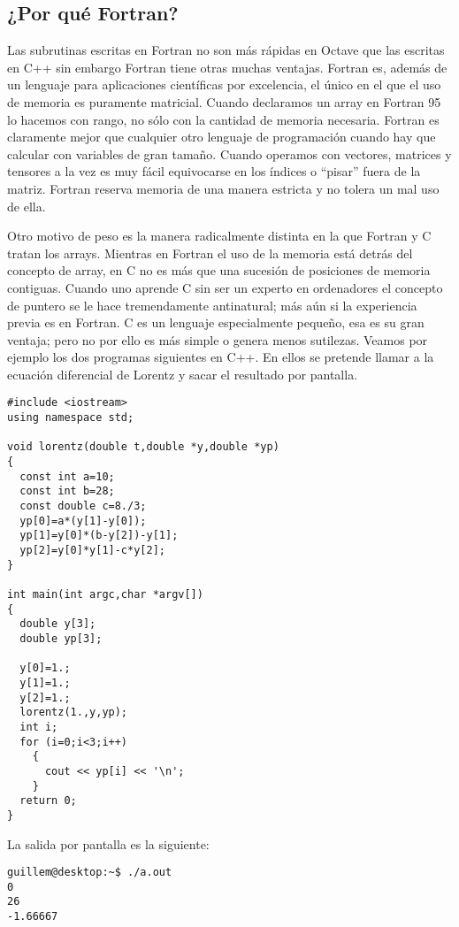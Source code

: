 \subsection{¿Por qué Fortran?}

Las subrutinas escritas en Fortran no son más rápidas en Octave que
las escritas en C++ sin embargo Fortran tiene otras muchas ventajas.
Fortran es, además de un lenguaje para aplicaciones científicas por
excelencia, el único en el que el uso de memoria es puramente
matricial.  Cuando declaramos un array en Fortran 95 lo hacemos con
rango, no sólo con la cantidad de memoria necesaria. Fortran es
claramente mejor que cualquier otro lenguaje de programación cuando
hay que calcular con variables de gran tamaño. Cuando operamos con
vectores, matrices y tensores a la vez es muy fácil equivocarse en los
índices o {}``pisar'' fuera de la matriz. Fortran reserva memoria de
una manera estricta y no tolera un mal uso de ella.

Otro motivo de peso es la manera radicalmente distinta en la que
Fortran y C tratan los arrays.  Mientras en Fortran el uso de la
memoria está detrás del concepto de array, en C no es más que una
sucesión de posiciones de memoria contiguas.  Cuando uno aprende C sin
ser un experto en ordenadores el concepto de puntero se le hace
tremendamente antinatural; más aún si la experiencia previa es en
Fortran. C es un lenguaje especialmente pequeño, esa es su gran
ventaja; pero no por ello es más simple o genera menos sutilezas.
Veamos por ejemplo los dos programas siguientes en C++.  En ellos se
pretende llamar a la ecuación diferencial de Lorentz y sacar el
resultado por pantalla.

\begin{verbatim}
#include <iostream>
using namespace std;

void lorentz(double t,double *y,double *yp)
{
  const int a=10;
  const int b=28;
  const double c=8./3;
  yp[0]=a*(y[1]-y[0]);
  yp[1]=y[0]*(b-y[2])-y[1];
  yp[2]=y[0]*y[1]-c*y[2];
}

int main(int argc,char *argv[])
{
  double y[3];
  double yp[3];

  y[0]=1.;
  y[1]=1.;
  y[2]=1.;
  lorentz(1.,y,yp);
  int i;
  for (i=0;i<3;i++)
    {
      cout << yp[i] << '\n';
    }
  return 0;
}
\end{verbatim}

La salida por pantalla es la siguiente:
\begin{verbatim}
guillem@desktop:~$ ./a.out
0
26
-1.66667
\end{verbatim}


